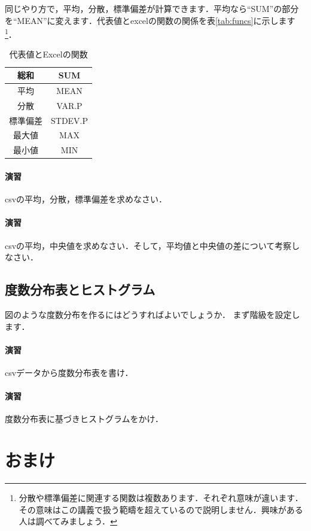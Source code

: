 \documentclass[12pt, a4j]{jreport}
\begin{document}
同じやり方で，平均，分散，標準偏差が計算できます．平均なら``SUM''の部分を``MEAN''に変えます．代表値とexcelの関数の関係を表\ref{tab:funcs}に示します\footnote{分散や標準偏差に関連する関数は複数あります．それぞれ意味が違います．その意味はこの講義で扱う範疇を超えているので説明しません．興味がある人は調べてみましょう．}．

\begin{table}[htb]
    \centering
    \caption{代表値とExcelの関数}
    \begin{tabular}{|c|c|}
      \hline
      総和 & SUM\\ \hline
      平均 & MEAN\\ \hline
      分散 & VAR.P\\ \hline
      標準偏差 & STDEV.P \\ \hline
      最大値 & MAX \\ \hline
      最小値 & MIN \\ \hline
    \end{tabular}
    \label{tab:hist}
\end{table}

\paragraph{演習}
csvの平均，分散，標準偏差を求めなさい．

\paragraph{演習}
csvの平均，中央値を求めなさい．そして，平均値と中央値の差について考察しなさい．

\subsection{度数分布表とヒストグラム}


図のような度数分布を作るにはどうすればよいでしょうか．
まず階級を設定します．

\paragraph{演習}
csvデータから度数分布表を書け．

\paragraph{演習}
度数分布表に基づきヒストグラムをかけ．


\section{おまけ}
\end{document}
